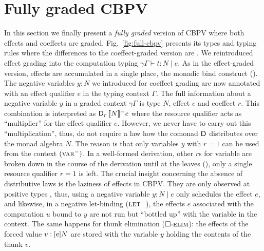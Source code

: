 \documentclass[acmsmall,review,anonymous]{acmart}\settopmatter{printfolios=true,printccs=false,printacmref=false}
\newcommand{\graybox}[1]{\grayboxtext{$#1$}}
\begin{document}
\section{Fully graded CBPV}
\label{sec:full-cbpv}

\newcommand{\peCompTy}[5]{(#1)#2 \vdash #3 : #5 \mid #4}
\newcommand{\qeCompTy}[5]{#1#2 \vdash #3 : #5 \mid #4}
\newcommand{\eext}[4]{#1\mathbin.#2:#4|#3}
\newcommand{\qeext}[6]{#1#2\mathbin.#3#4:#6|#5}

\newcommand{\gCompTy}[4]{\CompTy{#1}{#2}{\graybox{#3}}{#4}}
\newcommand{\gpeCompTy}[5]{(#1)#2 \vdash #3 : #5 \mid {\graybox{#4}}}
\newcommand{\gqeCompTy}[5]{#1#2 \vdash #3 : #5 \mid {\graybox{#4}}}
\newcommand{\gthunkty}[2]{\thunkty{\graybox{#1}}{#2}}
\newcommand{\geext}[4]{\eext{#1}{#2}{\graybox{#3}}{#4}}
\newcommand{\gqeext}[6]{\qeext{#1}{#2}{#3}{#4}{\graybox{#5}}{#6}}

In this section we finally present a \emph{fully graded} version of
CBPV where both effects and coeffects are graded.
Fig.~\ref{fig:full-cbpv} presents its types and typing rules where the
differences to the coeffect-graded version are
\graybox{\mbox{highlighted}}.
%
We reintroduced effect grading into the computation typing
$\qeCompTy \gamma \Gamma t e N$.  As in the effect-graded version,
effects are accumulated in a single place, the monadic bind construct
(\relim\diamond).  The negative variables $y : N$ we introduced for
coeffect grading are now annotated with an effect qualifier $e$ in the
typing context $\Gamma$.  The full information about a negative
variable $y$ in a graded context $\gamma\Gamma$ is type $N$, effect
$e$ and coeffect $r$.  This combination is interpreted as
$\D[r]\,\denn N e$ where the resource qualifier acts as ``multiplier''
for the effect qualifier $e$.  However, we never have to carry out
this ``multiplication'', thus, do not require a law how the comonad
$\D$ distributes over the monad algebra $N$.  The reason is that only
variables $y$ with $r=1$ can be used from the context $(\rvar^{-})$.
In a well-formed derivation, other $r$s for variable are broken down
in the course of the derivation until at the leaves (\rvar), only a
single resource qualifier $r=1$ is left.
%
The crucial insight concerning the absence of distributive laws is the
laziness of effects in CBPV.  They are only observed at positive
types \citep{levy:hosc06},
thus, using a negative variable $y : N \mid e$ only schedules
the effect $e$, and likewise, in a negative let-binding ($\rlet^{-}$),
the effects $e$ associated with the computation $u$ bound to $y$ are
not run but ``bottled up'' with the variable in the context.  The same
happens for thunk elimination ($\relim\Box$): the effects of the
forced value $v : \thunkty e N$ are stored with the variable $y$
holding the contents of the thunk $v$.
\end{document}
